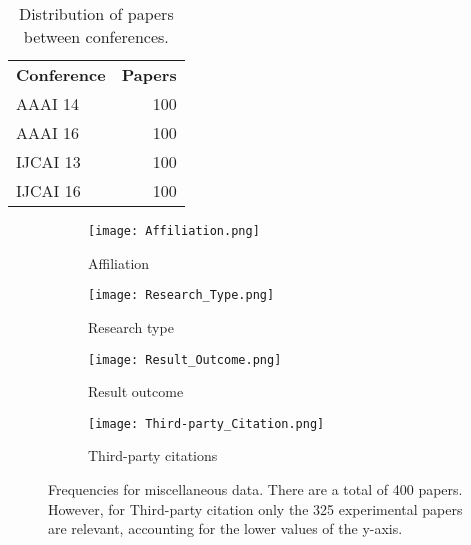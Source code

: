 \begin{table}[!htb]
\begin{center}
    \begin{tabular}{ lr }
    \textbf{Conference} & \textbf{Papers} \\
    AAAI 14 & 100 \\
    AAAI 16 & 100 \\
    IJCAI 13 & 100 \\
    IJCAI 16 & 100 \\
    \end{tabular}
\end{center}
\caption{Distribution of papers between conferences.}
\label{tab:conferences}
\end{table}

\begin{figure}[!htb]
\begin{center}
    \begin{subfigure}[b]{0.45\textwidth}
        \texttt{[image: Affiliation.png]}
        \caption{Affiliation}
        \label{fig:affiliation}
    \end{subfigure}
    \begin{subfigure}[b]{0.45\textwidth}
        \texttt{[image: Research\_Type.png]}
        \caption{Research type}
        \label{fig:research_type}
    \end{subfigure}
    \begin{subfigure}[b]{0.45\textwidth}
        \texttt{[image: Result\_Outcome.png]}
        \caption{Result outcome}
        \label{fig:result_outcome}
    \end{subfigure}
    \begin{subfigure}[b]{0.45\textwidth}
        \texttt{[image: Third-party\_Citation.png]}
        \caption{Third-party citations}
        \label{fig:third-party_citation}
    \end{subfigure}
    \caption[Summary of miscellaneous data.]{Frequencies for miscellaneous data. There are a total of 400 papers. However, for Third-party citation only the 325 experimental papers are relevant, accounting for the lower values of the y-axis.}
    \label{fig:miscellaneous-data}
\end{center}
\end{figure}


